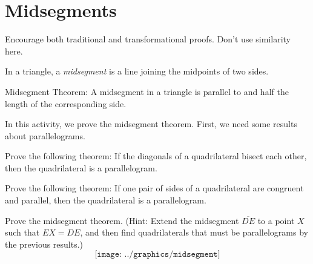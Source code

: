 \newpage

\section{Midsegments}
\begin{teachingnote}
Encourage both traditional and transformational proofs.  Don't use similarity here.
\end{teachingnote}
\begin{definition}
In a triangle, a \emph{midsegment} is a line joining the midpoints of two sides.  
\end{definition}

\begin{theorem}
Midsegment Theorem:  A midsegment in a triangle is parallel to and half the length of the corresponding side.
\end{theorem}

In this activity, we prove the midsegment theorem.  First, we need some results about parallelograms. 

\begin{prob}
Prove the following theorem:  If the diagonals of a quadrilateral bisect each other, then the quadrilateral is a parallelogram. 
\end{prob}

\begin{prob}
Prove the following theorem:  If one pair of sides of a quadrilateral are congruent and parallel, then the quadrilateral is a parallelogram. 
\end{prob}

\begin{prob}
Prove the midsegment theorem.  (Hint:  Extend the midsegment $\overline{DE}$ to a point $X$ such that $EX=DE$, and then find quadrilaterals that must be parallelograms by the previous results.)  
$$\texttt{[image: ../graphics/midsegment]}$$
\end{prob}




